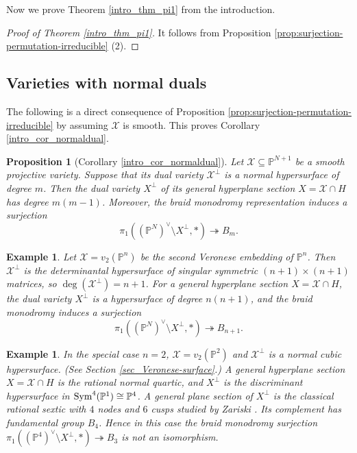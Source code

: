 \documentclass[12pt]{amsart}
\newcommand{\Sym}{\textup{Sym}}
\newtheorem{proposition}[theorem]{Proposition}
\newtheorem{example}[theorem]{Example}
\begin{document}
Now we prove Theorem \ref{intro_thm_pi1} from the introduction.

\begin{proof}[Proof of Theorem \ref{intro_thm_pi1}] It follows from Proposition \ref{prop:surjection-permutation-irreducible} (2). %
\end{proof}
\subsection{Varieties with normal duals}
 The following is a direct consequence of Proposition \ref{prop:surjection-permutation-irreducible} by assuming $\mathcal X$ is smooth. This proves Corollary \ref{intro_cor_normaldual}.
\begin{proposition}[Corollary \ref{intro_cor_normaldual}]\label{Prop_normaldual}
    Let $\mathcal X\subseteq\mathbb P^{N+1}$ be a smooth projective variety. Suppose that its dual variety $\mathcal X^{\perp}$ is a normal hypersurface of degree $m$. Then the dual variety $X^{\perp}$ of its general hyperplane section $X=\mathcal X\cap H$ has degree $m(m-1)$. Moreover, the braid monodromy representation induces a surjection 
$$\pi_1((\mathbb P^N)^{\vee}\setminus X^{\perp},*)\twoheadrightarrow B_m.$$
\end{proposition}






\begin{example}\normalfont
   Let $\mathcal X=v_2(\mathbb P^n)$ be the second Veronese embedding of $\mathbb P^n$. Then
$\mathcal X^\perp$ is the determinantal hypersurface of singular symmetric
$(n+1)\times (n+1)$ matrices, so $\deg(\mathcal X^\perp)=n+1$.
For a general hyperplane section $X=\mathcal X\cap H$, the dual variety
$X^\perp$ is a hypersurface of degree $n(n+1)$, and the braid monodromy induces
a surjection
\[
\pi_1((\mathbb P^N)^\vee\setminus X^\perp,*)\twoheadrightarrow B_{n+1}.
\]
\end{example}
\begin{example}\normalfont\label{example_B4} 
In the special case $n=2$, $\mathcal X=v_2(\mathbb P^2)$ and $\mathcal X^\perp$
is a normal cubic hypersurface. (See Section \ref{sec_Veronese-surface}.) A general hyperplane section $X=\mathcal X\cap H$
is the rational normal quartic, and $X^\perp$ is the discriminant hypersurface in
$\Sym^4(\mathbb P^1)\cong \mathbb P^4$. A general plane section of $X^\perp$ is the
classical rational sextic with $4$ nodes and $6$ cusps studied by Zariski \cite{Zar36}.
Its complement has fundamental group $B_4$. Hence in this case the braid monodromy
surjection
$\pi_1((\mathbb P^4)^\vee\setminus X^\perp,*)\twoheadrightarrow B_3$
is not an isomorphism.
\end{example}
\end{document}
